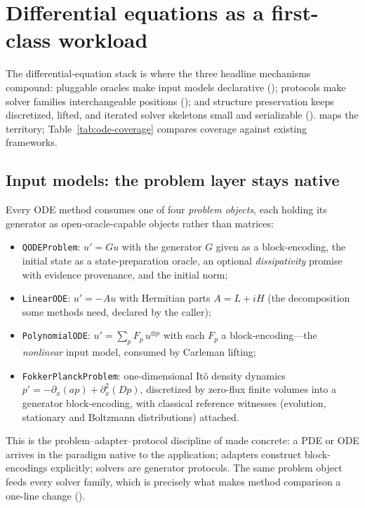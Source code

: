 \section{Differential equations as a first-class workload}
\label{sec:ode}

The differential-equation stack is where the three headline mechanisms
compound: pluggable oracles make input models declarative
(); protocols make solver families interchangeable
positions (); and structure preservation keeps
discretized, lifted, and iterated solver skeletons small and serializable
().   maps the territory;
Table~\ref{tab:ode-coverage} compares coverage against existing frameworks.

\subsection{Input models: the problem layer stays native}
\label{sec:ode-inputs}

Every ODE method consumes one of four \emph{problem objects}, each holding
its generator as open-oracle-capable objects rather than matrices:

\begin{itemize}
\item \texttt{QODEProblem}: $u' = G u$ with the generator $G$ given as a
  block-encoding, the initial state as a state-preparation oracle, an
  optional \emph{dissipativity} promise with evidence provenance, and the
  initial norm;
\item \texttt{LinearODE}: $u' = -Au$ with Hermitian parts $A = L + iH$
  (the decomposition some methods need, declared by the caller);
\item \texttt{PolynomialODE}: $u' = \sum_p F_p\, u^{\otimes p}$ with each
  $F_p$ a block-encoding---the \emph{nonlinear} input model, consumed by
  Carleman lifting;
\item \texttt{FokkerPlanckProblem}: one-dimensional It\^o density dynamics
  $p' = -\partial_x(ap) + \partial_x^2(Dp)$, discretized by zero-flux finite
  volumes into a generator block-encoding, with classical reference
  witnesses (evolution, stationary and Boltzmann distributions) attached.
\end{itemize}

This is the problem--adapter--protocol discipline of
 made concrete: a PDE or ODE arrives in the
paradigm native to the application; adapters construct block-encodings
explicitly; solvers are generator protocols.  The same problem object feeds
every solver family, which is precisely what makes method comparison a
one-line change ().

